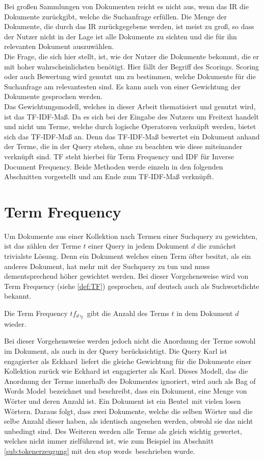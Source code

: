 Bei großen Sammlungen von Dokumenten reicht es nicht aus, wenn das IR die Dokumente zurückgibt, welche die Suchanfrage erfüllen. Die Menge der Dokumente, die durch das IR zurückgegebene werden, ist meist zu groß, so dass der Nutzer nicht in der Lage ist alle Dokumente zu sichten und die für ihn relevanten Dokument auszuwählen.\\
Die Frage, die sich hier stellt, ist, wie der Nutzer die Dokumente bekommt, die er mit hoher wahrscheinlichsten benötigt. Hier fällt der Begriff des Scorings. Scoring oder auch Bewertung wird genutzt um zu bestimmen, welche Dokumente für die Suchanfrage am relevantesten sind. Es kann auch von einer Gewichtung der Dokumente gesprochen werden.\\
Das Gewichtungsmodell, welches in dieser Arbeit thematisiert und genutzt wird, ist das TF-IDF-Maß. Da es sich bei der Eingabe des Nutzers um Freitext handelt und nicht um Terme, welche durch logische Operatoren verknüpft werden, bietet sich das TF-IDF-Maß an. Denn das TF-IDF-Maß bewertet ein Dokument anhand der Terme, die in der Query stehen, ohne zu beachten wie diese miteinander verknüpft sind. TF steht hierbei für Term Frequency und IDF für Inverse Document Frequency. Beide Methoden werde einzeln in den folgenden Abschnitten vorgestellt und am Ende zum TF-IDF-Maß verknüpft.

\section{Term Frequency}
Um Dokumente aus einer Kollektion nach Termen einer Suchquery zu gewichten, ist das zählen der Terme $t$ einer Query in jedem Dokument $d$ die zunächst trivialste Lösung. Denn ein Dokument welches einen Term öfter besitzt, als ein anderes Dokument, hat mehr mit der Suchquery zu tun und muss dementsprechend höher gewichtet werden.\newpage
Bei dieser Vorgehensweise wird von Term Frequency (siehe \cref{def:TF}) gesprochen, auf deutsch auch als Suchwortdichte bekannt.
\begin{defi}\label{def:TF}
	Die Term Frequency $tf_d,_t$ gibt die Anzahl des Terms $t$ in dem Dokument $d$ wieder.
\end{defi}
Bei dieser Vorgehensweise werden jedoch nicht die Anordnung der Terme sowohl im Dokument, als auch in der Query berücksichtigt. Die Query \glqq Karl ist engagierter als Eckhard\grqq\ liefert die gleiche Gewichtung für die Dokumente einer Kollektion zurück wie \glqq Eckhard ist engagierter als Karl\grqq . Dieses Modell, das die Anordnung der Terme innerhalb des Dokumentes ignoriert, wird auch als \glqq Bag of Words Model\grqq\ bezeichnet und beschreibt, dass ein Dokument, eine Menge von Wörter und deren Anzahl ist. Ein Dokument ist ein \glqq Beutel\grqq\ mit vielen losen Wörtern. Daraus folgt, dass zwei Dokumente, welche die selben Wörter und die selbe Anzahl dieser haben, als identisch angesehen werden, obwohl sie das nicht unbedingt sind. Des Weiteren werden alle Terme als gleich wichtig gewertet, welches nicht immer zielführend ist, wie zum Beispiel im Abschnitt \ref{sub:tokenerzeugung} mit den \glqq stop words\grqq\ beschrieben wurde.

